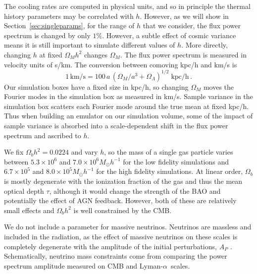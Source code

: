 \documentclass[a4paper,11pt]{article}
\newcommand{\Lya}{Lyman-$\alpha$}
\begin{document}
The cooling rates are computed in physical units, and so in principle the thermal history parameters may be correlated with $h$. However, as we will show in Section~\ref{sec:singleparams}, for the range of $h$ that we consider, the flux power spectrum is changed by only $1\%$. However, a subtle effect of cosmic variance means it is still important to simulate different values of $h$. More directly, changing $h$ at fixed $\Omega_M h^2$ changes $\Omega_M$. The flux power spectrum is measured in velocity units of s/km. The conversion between comoving kpc/h and km/s is
\begin{equation}
 1 \,\mathrm{km/s} =  100\, a \,(\Omega_M /a^3 + \Omega_\Lambda )^{1/2}\; \mathrm{kpc/h}\,.
\end{equation}
Our simulation boxes have a fixed size in kpc/h, so changing $\Omega_M$ moves the Fourier modes in the simulation box as measured in km/s. Sample variance in the simulation box scatters each Fourier mode around the true mean at fixed kpc/h. Thus when building an emulator on our simulation volume, some of the impact of sample variance is absorbed into a scale-dependent shift in the flux power spectrum and ascribed to $h$.

We fix $\Omega_b h^2 = 0.0224$ and vary $h$, so
the mass of a single gas particle varies between $5.3\times10^6$ and $7.0 \times 10^6 M_\odot h^{-1}$ for the low fidelity simulations and $6.7\times10^5$ and $8.0 \times 10^5 M_\odot h^{-1}$ for the high fidelity simulations. At linear order, $\Omega_b$ is mostly degenerate with the ionization fraction of the gas and thus the mean optical depth $\tau$, although it would change the strength of the BAO and potentially the effect of AGN feedback. However, both of these are relatively small effects and $\Omega_b h^2$ is well constrained by the CMB.

We do not include a parameter for massive neutrinos. Neutrinos are massless and included in the radiation, as the effect of massive neutrinos on these scales is completely degenerate with the amplitude of the initial perturbations, $A_P$ \cite{Pedersen:2020}.
Schematically, neutrino mass constraints come from comparing the power spectrum amplitude measured on CMB and \Lya~scales.
\end{document}

